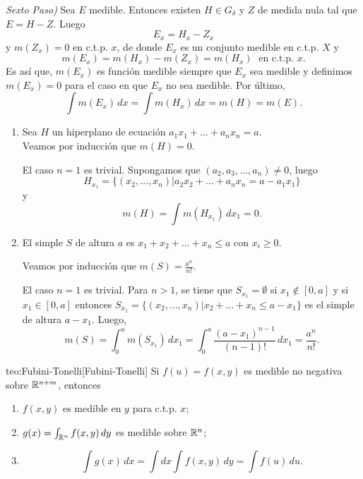 \begin{demo}
 \emph{Sexto Paso)} Sea $E$ medible. Entonces existen $H\in G_{\delta}$ y $Z$ de medida nula tal que $E=H-Z$. 
 Luego
 \[E_x=H_x -Z_x\]
 y $m(Z_x)=0$ en c.t.p. $x$, de donde $E_x$ es un conjunto medible en c.t.p. $X$ y 
 \[
 m(E_x)=m(H_x)-m(Z_x)=m(H_x)\;\mbox{  en c.t.p. } x.
 \]
 Es as\'i que, $m(E_x)$ es funci\'on medible siempre que $E_x$ sea medible y 
 definimos $m(E_x)=0$ para el caso en que $E_x$ no sea medible. Por \'ultimo,  \[
 \int m(E_x)\,dx=\int m(H_x)\,dx=m(H)=m(E).
 \]
\end{demo}

\begin{ejemplo}{}
\begin{enumerate}
    \item 
Sea $H$ un hiperplano de ecuaci\'on $a_1x_1+\ldots+a_nx_n=a$. 
\\Veamos por inducci\'on que $m(H)=0$.

El caso $n=1$ es trivial. 
Supongamos que $(a_2,a_3,\ldots,a_n)\neq 0$, luego 
\[H_{x_1}=\{(x_2,\ldots,x_n)| a_2x_2+\ldots+a_nx_n=a-a_1x_1\}\]
y 
\[
m(H)=\int m(H_{x_1})\,dx_1=0.
\]
\item El simple $S$ de altura $a$ es $x_1+x_2+\ldots+x_n\leq a$ con $x_i\geq 0$. 

Veamos por inducci\'on que $m(S)=\frac{a^n}{n!}$. 

El caso $n=1$ es trivial. Para  $n>1$, se tiene que $S_{x_1}=\emptyset$ si $x_1\notin [0,a]$ y si $x_1 \in [0,a]$ entonces 
$S_{x_1}=\{(x_2,\ldots,x_n)|x_2+\dots+x_n\leq a-x_1 \}$ es el simple de altura $a-x_1$. Luego, 
\[
m(S)=\int_0^a m(S_{x_1})\,dx_1= \int_0^a \frac{(a-x_1)^{n-1}}{(n-1)!}\,dx_1=\frac{a^n}{n!}.
\]     
\end{enumerate}   
\end{ejemplo}
   
   
   \begin{teorema}{teo:Fubini-Tonelli}[Fubini-Tonelli]
   Si $f(u)=f(x,y)$ es medible no negativa sobre $\mathbb{R}^{n+m}$, entonces
   \begin{enumerate}
       \item $f(x,y)$ es medible en $y$ para c.t.p. $x$;
       \item $g(x)=\int_{\mathbb{R}^n} f(x,y)\,dy$ es medible sobre $\mathbb{R}^n$;
       \item 
       \[
       \int g(x)\,dx=\int dx \int f(x,y)\,dy=\int f(u)\,du.
       \]
   \end{enumerate}
      \end{teorema}     
      
